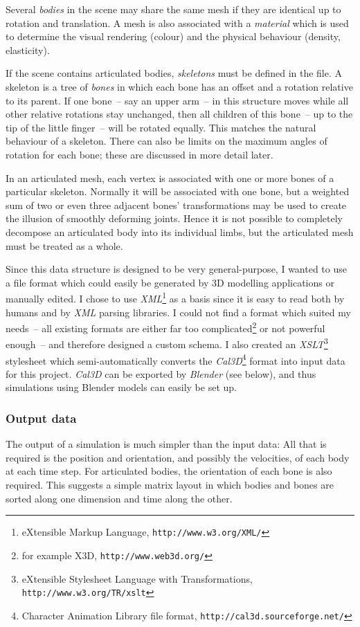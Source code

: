 Several \emph{bodies} in the scene may share the same mesh if they are identical up to rotation
and translation. A mesh is also associated with a \emph{material} which is used to determine the
visual rendering (colour) and the physical behaviour (density, elasticity).

If the scene contains articulated bodies, \emph{skeletons} must be defined in the file. A skeleton
is a tree of \emph{bones} in which each bone has an offset and a rotation relative to its parent.
If one bone~-- say an upper arm~-- in this structure moves while all other relative rotations stay
unchanged, then all children of this bone~-- up to the tip of the little finger~-- will be rotated
equally. This matches the natural behaviour of a skeleton. There can also be limits on the maximum
angles of rotation for each bone; these are discussed in more detail later.

In an articulated mesh, each vertex is associated with one or more bones of a particular skeleton.
Normally it will be associated with one bone, but a weighted sum of two or even three adjacent
bones' transformations may be used to create the illusion of smoothly deforming joints. Hence it
is not possible to completely decompose an articulated body into its individual limbs, but the
articulated mesh must be treated as a whole.

Since this data structure is designed to be very general-purpose, I wanted to use a file format
which could easily be generated by 3D modelling applications or manually edited. I chose to use
\textsl{XML}\footnote{eXtensible Markup Language, \texttt{http://www.w3.org/XML/}} as a basis
since it is easy to read both by humans and by \textsl{XML} parsing libraries. I could not
find a format which suited my needs~-- all existing formats are either far too
complicated\footnote{for example X3D, \texttt{http://www.web3d.org/}} or not
powerful enough~-- and therefore designed a custom schema. I also created an
\textsl{XSLT}\footnote{eXtensible Stylesheet Language with Transformations,
\texttt{http://www.w3.org/TR/xslt}} stylesheet which semi-automatically converts the
\textsl{Cal3D}\footnote{Character Animation Library file format, \texttt{http://cal3d.sourceforge.net/}}
format into input data for this project. \textsl{Cal3D} can be exported by \textsl{Blender}
(see below), and thus simulations using Blender models can easily be set up.

\subsubsection{Output data}
The output of a simulation is much simpler than the input data: All that is required is the
position and orientation, and possibly the velocities, of each body at each time step. For
articulated bodies, the orientation of each bone is also required. This suggests a simple
matrix layout in which bodies and bones are sorted along one dimension and time along
the other.

